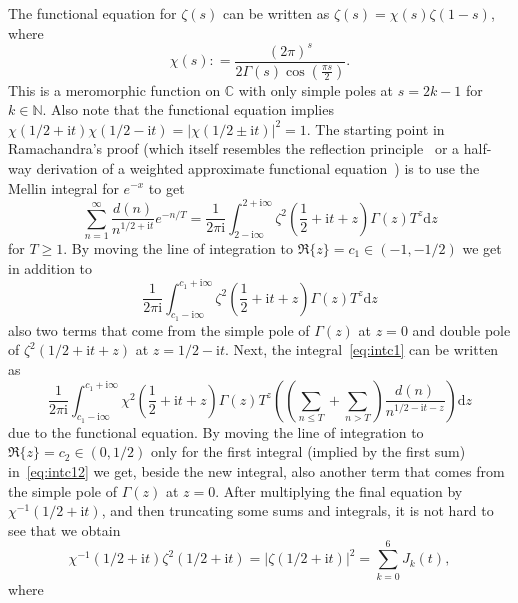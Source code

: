 \documentclass[a4paper,reqno]{amsart}
\theoremstyle{definition}
\newcommand{\C}{\mathbb{C}}
\newcommand{\de}[0]{\mathrel{\mathop:}=}
\newcommand{\ie}[0]{\mathrm{i}}
\newcommand{\dif}[1]{\mathrm{d}#1}
\begin{document}
The functional equation for $\zeta(s)$ can be written as $\zeta(s)=\chi(s)\zeta(1-s)$, where
\begin{equation}
\label{eq:chiDef}
\chi(s) \de \frac{(2\pi)^{s}}{2\Gamma(s)\cos{\left(\frac{\pi s}{2}\right)}}.
\end{equation}
This is a meromorphic function on $\C$ with only simple poles at $s=2k-1$ for $k\in\mathbb{N}$. Also note that the functional equation implies $\chi(1/2+\ie t)\chi(1/2-\ie t)=\left|\chi(1/2\pm \ie t)\right|^{2}=1$. The starting point in Ramachandra's proof (which itself resembles the reflection principle~\cite[Section~4.4]{Ivic} or a half-way derivation of a weighted approximate functional equation~\cite[Section~4.5]{IvicZFunctionBook}) is to use the Mellin integral for $e^{-x}$ to get
\[
\sum_{n=1}^{\infty}\frac{d(n)}{n^{1/2+\ie t}}e^{-n/T} = \frac{1}{2\pi\ie}\int_{2-\ie\infty}^{2+\ie\infty}\zeta^{2}\left(\frac{1}{2}+\ie t+z\right)\Gamma(z)T^{z}\dif{z}
\]
for $T\geq 1$. By moving the line of integration to $\Re\{z\}=c_1\in(-1,-1/2)$ we get in addition to
\begin{equation}
\label{eq:intc1}
\frac{1}{2\pi\ie}\int_{c_1-\ie\infty}^{c_1+\ie\infty}\zeta^{2}\left(\frac{1}{2}+\ie t+z\right)\Gamma(z)T^{z}\dif{z}
\end{equation}
also two terms that come from the simple pole of $\Gamma(z)$ at $z=0$ and double pole of $\zeta^2(1/2+\ie t+z)$ at $z=1/2-\ie t$. Next, the integral~\eqref{eq:intc1} can be written as
\begin{equation}
\label{eq:intc12}
\frac{1}{2\pi\ie}\int_{c_1-\ie\infty}^{c_1+\ie\infty}\chi^{2}\left(\frac{1}{2}+\ie t+z\right)\Gamma(z)T^{z}\left(\left(\sum_{n\leq T}+\sum_{n>T}\right)\frac{d(n)}{n^{1/2-\ie t-z}}\right)\dif{z}
\end{equation}
due to the functional equation. By moving the line of integration to $\Re\{z\}=c_2\in(0,1/2)$ only for the first integral (implied by the first sum) in~\eqref{eq:intc12} we get, beside the new integral, also another term that comes from the simple pole of $\Gamma(z)$ at $z=0$. After multiplying the final equation by $\chi^{-1}(1/2+\ie t)$, and then truncating some sums and integrals, it is not hard to see that we obtain 
\begin{equation}
\label{eq:zeta2}
\chi^{-1}(1/2+\ie t)\zeta^{2}(1/2+\ie t)=\left|\zeta(1/2+\ie t)\right|^{2}=\sum_{k=0}^{6}J_k(t),
\end{equation}
where
\end{document}
